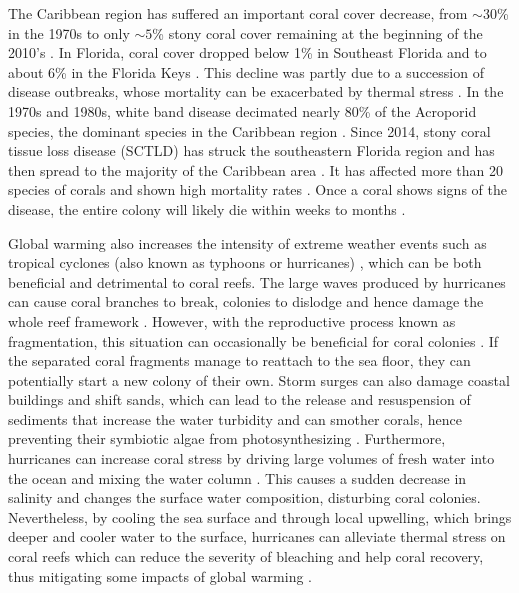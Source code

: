 \documentclass[fleqn,10pt]{wlscirep}
\newcommand{\modif}[1]{{#1}}
\begin{document}
The Caribbean region has suffered an important coral cover decrease, from $\sim30$\% \modif{in} the 1970s to only $\sim5$\% stony coral cover remaining at the beginning of the 2010's  \citep{Porter1992Dec,Ruzicka2013Aug}. In Florida, coral cover dropped below 1\% in Southeast Florida and to about 6\% in the Florida Keys \cite{grove2022national}. This decline was partly due to a succession of disease outbreaks, whose mortality can be exacerbated by thermal stress \citep{muller2012caribbean,muller2018bleaching}. In the 1970s and 1980s, white band disease decimated nearly 80\% of the Acroporid species, the dominant species in the Caribbean region \citep{Kline2011,Aronson2001Sep}. Since 2014, stony coral tissue loss disease (SCTLD) has struck the southeastern Florida region and has then spread to the \modif{majority of the} Caribbean area \citep{Precht2016Aug}. It has affected more than 20 species of corals and shown high mortality rates \citep{Alvarez-Filip2022Jun}. Once a coral shows signs of the disease, the entire  colony will likely die within weeks to months \citep{NOAA2020Nov}.

Global warming also increases the intensity of extreme weather events such as tropical cyclones (also known as typhoons or hurricanes) \modif{\citep{Bhatia2019Feb, Knutson2020Mar}}, which can be both beneficial and detrimental to coral reefs. The large waves produced by hurricanes can cause coral branches to break, colonies to dislodge and hence damage the whole reef framework \citep{Scoffin1993Nov, Carter2022}. However, with the reproductive process known as fragmentation, this situation can occasionally be beneficial for coral colonies \citep{Bonin2011Jul}. If the separated coral fragments manage to reattach to the sea floor, they can potentially start a new colony of their own. Storm surges can also damage coastal buildings and shift sands, which can lead to the release and resuspension of sediments that increase the water turbidity and can smother corals, hence preventing their symbiotic algae from photosynthesizing \citep{Erftemeijer2012Sep, Jones2015Nov}. Furthermore, hurricanes can increase coral stress by driving large volumes of fresh water into the ocean and mixing the water column \citep{Allahdadi2017Apr}. This causes a sudden decrease in salinity and changes the surface water composition, disturbing coral colonies. Nevertheless, by cooling the sea surface and through local upwelling, which brings deeper and cooler water to the surface, hurricanes can alleviate thermal stress on coral reefs which can \modif{reduce the severity of bleaching and help coral recovery}, thus mitigating some impacts of global warming \citep{Aijaz2017May, Varlas2020Jul, carrigan2014tropical, Manzello2007Jul}.
\end{document}
